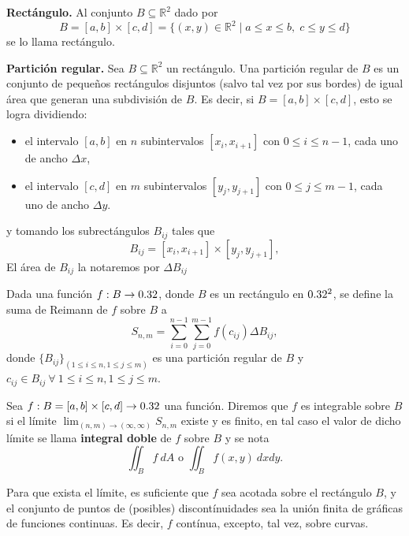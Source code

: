\begin{definition}  \textbf{Rect\'angulo.} Al conjunto \( B  \subseteq  \mathbb{R}^2 \) dado por
	\[
	B = [a, b] \times [c, d] = \{(x, y) \in \mathbb{R}^2 \mid a \leq x \leq b, \; c \leq y \leq d\}
	\]
	se lo llama rect\'angulo.   
\end{definition}	

\begin{definition} \textbf{Partici\'on regular.} 	Sea \( B  \subseteq  \mathbb{R}^2 \) un rect\'angulo.  Una partición regular de $B$ es un conjunto de pequeños rectángulos disjuntos (salvo tal vez por sus bordes)  de igual \'area que  generan una subdivisi\'on de $B$.  Es decir, si $B = [a, b] \times [c, d]$,  esto se logra dividiendo:
	
	\begin{itemize}
		\item el intervalo \( [a, b] \) en \( n \) subintervalos \( [x_i, x_{i+1}] \) con $0 \leq  i \leq n-1$, cada uno de ancho \( \Delta x \),
		\item el intervalo \( [c, d] \) en \( m \) subintervalos \( [y_j, y_{j+1}] \) con $0 \leq  j \leq m-1$, cada uno de ancho \( \Delta y \).
	\end{itemize}
y tomando los subrect\'angulos $B_{ij}$ tales que
	\[
	B_{ij} = [x_i, x_{i+1}] \times [y_j, y_{j+1}], 
	\]  El \'area de $ B_{ij}$ la notaremos por $\Delta B_{ij}$ 
\end{definition}


\begin{definition}
Dada una funci\'on $f:B\to0.32$, donde $B$ es un rect\'angulo en $0.32^2$, se define la suma de Reimann de $f$ sobre $B$ a 
\[
    S_{n,m}=\sum_{i=0}^{n-1}\sum_{j=0}^{m-1} f(c_{ij})\Delta B_{ij},
\]  
donde $\{ B_{ij}\}_{( 1 \leq i \leq n, 1 \leq j \leq m )}$ es una partici\'on regular de $B$ y  $c_{ij}\in B_{ij} \: \forall \: 1 \leq i \leq n, 1 \leq j \leq m$. 
\end{definition}

\begin{definition} 
    Sea $f:B=[a,b]\times[c,d]\to0.32$ una funci\'on. Diremos que $f$ es integrable sobre $B$ si  el l\'imite $\lim_{(n,m)\to (\infty,\infty)}S_{n,m}$  existe y es finito, en tal caso el valor de dicho  l\'imite  se llama \textbf{integral doble} de $f$ sobre $B$ y se nota 
    \[
          \iint_B f\:dA  \mbox{ o } \iint_B f(x,y)\:dxdy.
    \]
\end{definition}

\begin{obs}
Para que exista el límite,  es suficiente que $f$ sea acotada sobre el rectángulo $B$, y el conjunto de puntos de (posibles) discontínuidades  sea la unión finita de gráficas
de funciones continuas. Es decir, $f$ contínua, excepto, tal vez, sobre curvas.
\end{obs}


